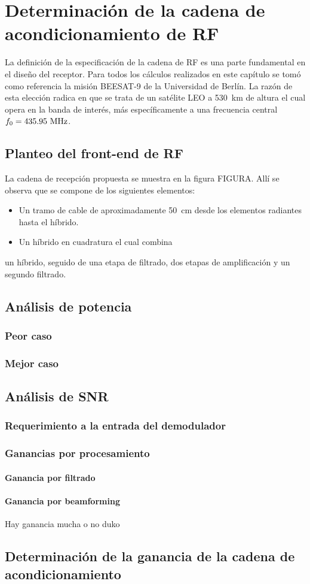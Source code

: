 \documentclass[../../main.tex]{subfiles}
\begin{document}
\chapter{Determinación de la cadena de acondicionamiento de RF}

La definición de la especificación de la cadena de RF es una parte fundamental en el diseño del receptor. Para todos los cálculos realizados en este capítulo se tomó como referencia la misión BEESAT-9 \cite{BEESAT-9} de la Universidad de Berlín. La razón de esta elección radica en que se trata de un satélite LEO a 530~km de altura el cual opera en la banda de interés, más específicamente a una frecuencia central $f_0 = 435.95~\textrm{MHz}$.

\section{Planteo del front-end de RF}
La cadena de recepción propuesta se muestra en la figura FIGURA. Allí se observa que se compone de los siguientes elementos:
\begin{itemize}
    \item Un tramo de cable de aproximadamente 50~cm desde los elementos radiantes hasta el híbrido.
    \item Un híbrido en cuadratura el cual combina              
\end{itemize}

un híbrido, seguido de una etapa de filtrado, dos etapas de amplificación y un segundo filtrado.
\section{Análisis de potencia} 

\subsection{Peor caso}
\subsection{Mejor caso}

\section{Análisis de SNR}
\subsection{Requerimiento a la entrada del demodulador}
\subsection{Ganancias por procesamiento}
\subsubsection{Ganancia por filtrado}
\subsubsection{Ganancia por beamforming}
Hay ganancia mucha o no duko
\section{Determinación de la ganancia de la cadena de acondicionamiento}
\end{document}
